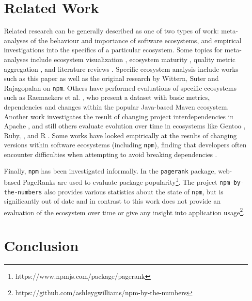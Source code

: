 \documentclass[10pt,conference]{IEEEtran}
\def\code#1{\texttt{#1}}
\begin{document}

\section{Related Work}

Related research can be generally described as one of two types
of work: meta-analyses of the behaviour and importance
of software ecosystems, and empirical investigations into the
specifics of a particular ecosystem. Some topics 
for meta-analyses include ecosystem visualization \cite{LUNGU2010264},
ecosystem maturity \cite{Alves:2011}, quality metric aggregation \cite{Mordal:2013},
and literature reviews \cite{Manikas:2013, Manikas:2017}. Specific ecosystem analysis include works such as this
paper as well as the original research by Wittern, Suter and Rajagopalan \cite{Wittern:2016} on \code{npm}.
Others have performed evaluations of specific ecosystems such as Raemaekers et al. \cite{Raemaekers:2013},
who present a dataset with basic metrics, dependencies and changes within the popular 
Java-based Maven ecosystem. Another work investigates the
result of changing project interdependencies in Apache \cite{Bavota:2013}, 
and still others evaluate evolution over time in ecosystems like
Gentoo \cite{Bloemen:2014}, Ruby, \cite{Kabbedijk:2011}, and R \cite{Plakidas:2017}.
Some works have looked empirically at the results of changing versions
within software ecosystems (including \code{npm}), finding that
developers often encounter difficulties when attempting to avoid
breaking dependencies \cite{Bogart:2015}.

Finally, \code{npm} has been investigated informally. In
the \code{pagerank} package, web-based PageRanks are used to evaluate
package popularity\footnote{https://www.npmjs.com/package/pagerank}.
The project \code{npm-by-the-numbers} also provides various statistics
about the state of \code{npm}, but is significantly out of date and 
in contrast to this work does not provide an evaluation of the ecosystem over time
or give any insight into application usage\footnote{https://github.com/ashleygwilliams/npm-by-the-numbers}.


\section{Conclusion}
\end{document}
